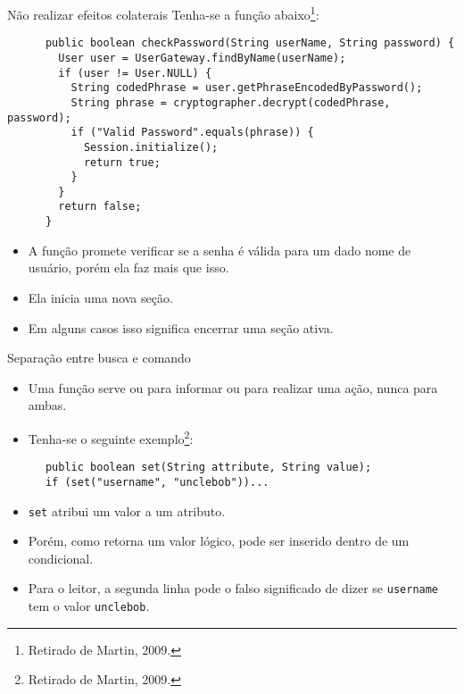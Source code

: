 \documentclass[11pt]{beamer}
\begin{document}
  \begin{frame}[fragile]{Não realizar efeitos colaterais}
    Tenha-se a função abaixo\footnote{Retirado de Martin, 2009.}:
    
    \begin{lstlisting}
      public boolean checkPassword(String userName, String password) {
        User user = UserGateway.findByName(userName);
        if (user != User.NULL) {
          String codedPhrase = user.getPhraseEncodedByPassword();
          String phrase = cryptographer.decrypt(codedPhrase, password);
          if ("Valid Password".equals(phrase)) {
            Session.initialize();
            return true;
          }
        }
        return false;
      }
    \end{lstlisting}
    \begin{itemize}
      \item A função promete verificar se a senha é válida para um dado nome de usuário, porém ela faz mais que isso.
      \item Ela inicia uma nova seção.
      \item Em alguns casos isso significa encerrar uma seção ativa.
    \end{itemize}
  \end{frame}

  \begin{frame}[fragile]{Separação entre busca e comando}
    \begin{itemize}
      \item Uma função serve ou para informar ou para realizar uma ação, nunca para ambas.
      \item Tenha-se o seguinte exemplo\footnote{Retirado de Martin, 2009.}:
    \end{itemize}
    \begin{lstlisting}
      public boolean set(String attribute, String value);
      if (set("username", "unclebob"))...
    \end{lstlisting}
    \begin{itemize}
      \item \verb|set| atribui um valor a um atributo.
      \item Porém, como retorna um valor lógico, pode ser inserido dentro de um condicional.
      \item Para o leitor, a segunda linha pode o falso significado de dizer se \verb|username| tem o valor \verb|unclebob|. 
    \end{itemize}
  \end{frame}
\end{document}

